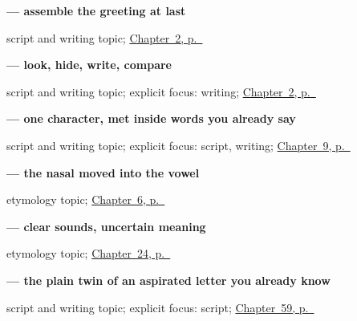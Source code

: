 \noindent\begin{minipage}[t]{\linewidth}
\raggedright
\textbf{ — assemble the greeting at last}\par
\footnotesize script and writing topic; \hyperref[ch:introductions]{Chapter~2, p.~\pageref*{ch:introductions}}
\end{minipage}\par\smallskip

\noindent\begin{minipage}[t]{\linewidth}
\raggedright
\textbf{ — look, hide, write, compare}\par
\footnotesize script and writing topic; explicit focus: writing; \hyperref[ch:introductions]{Chapter~2, p.~\pageref*{ch:introductions}}
\end{minipage}\par\smallskip

\noindent\begin{minipage}[t]{\linewidth}
\raggedright
\textbf{ — one character, met inside words you already say}\par
\footnotesize script and writing topic; explicit focus: script, writing; \hyperref[ch:hi-sorry]{Chapter~9, p.~\pageref*{ch:hi-sorry}}
\end{minipage}\par\smallskip

\noindent\begin{minipage}[t]{\linewidth}
\raggedright
\textbf{ — the nasal moved into the vowel}\par
\footnotesize etymology topic; \hyperref[ch:hi-numbers-1-5]{Chapter~6, p.~\pageref*{ch:hi-numbers-1-5}}
\end{minipage}\par\smallskip

\noindent\begin{minipage}[t]{\linewidth}
\raggedright
\textbf{ — clear sounds, uncertain meaning}\par
\footnotesize etymology topic; \hyperref[ch:hi-green-and-yellow]{Chapter~24, p.~\pageref*{ch:hi-green-and-yellow}}
\end{minipage}\par\smallskip

\noindent\begin{minipage}[t]{\linewidth}
\raggedright
\textbf{ — the plain twin of an aspirated letter you already know}\par
\footnotesize script and writing topic; explicit focus: script; \hyperref[ch:hi-script-second-wave]{Chapter~59, p.~\pageref*{ch:hi-script-second-wave}}
\end{minipage}\par\smallskip

